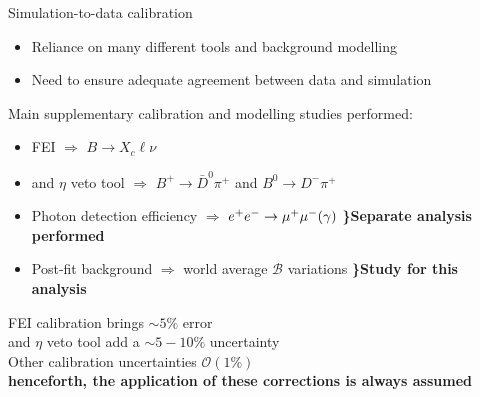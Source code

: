 \documentclass[xcolor=dvipsnames]{beamer}
\begin{document}
\begin{frame}{Simulation-to-data calibration}

   \scriptsize\centering
   
   \begin{itemize}
      \item Reliance on many different tools and background modelling
      \item Need to ensure adequate agreement between data and simulation
   \end{itemize}

   \vspace{10pt}

  Main supplementary calibration and modelling studies performed:

   \begin{itemize}
      \item FEI \hspace{81pt} $\Rightarrow$ $B\to X_c \ell \nu$ 
      \item \piz and $\eta$ veto tool \hspace{27pt}  $\Rightarrow$ $B^+\to \bar{D}^0\pi^+$ and $B^0\to D^-\pi^+$
      \item Photon detection efficiency  $\Rightarrow$ $e^+e^-\rightarrow\mu^+\mu^-(\gamma)$ \hspace{27pt} \textbf{\}Separate analysis performed}
      \item Post-fit background \hspace{24pt} $\Rightarrow$ world average $\mathcal{B}$ variations \hspace{2pt} \textbf{\}Study for this analysis}
   \end{itemize}

   \vspace{10pt}

   \ra FEI calibration brings $\sim 5\%$ error\\
   \ra \piz and $\eta$ veto tool add a $\sim 5-10\%$ uncertainty\\
   \ra Other calibration uncertainties $\mathcal{O}(1\%)$\\

   \textbf{\ra henceforth, the application of these corrections is always assumed}

\end{frame}
\end{document}
